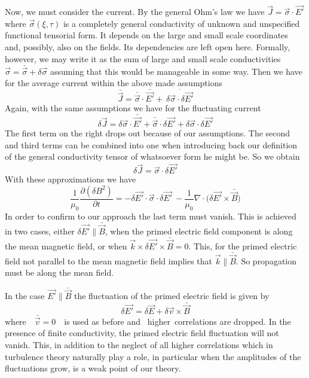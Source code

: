 \documentclass[ ]{copernicus2}
\begin{document}
{{{{Now, we must consider the current. By the general Ohm's law we have $\vec{J}=\vec{\sigma}\cdot\vec{E'}$ where $\vec{\sigma}(\xi,\tau)$ is a completely general conductivity of unknown and unspecified functional tensorial form. It depends on the large and small scale coordinates and, possibly, also on the fields. Its dependencies are left open here. Formally, however, we may write it as the sum of large and small scale conductivities $\vec{\sigma}=\bar{\vec{\sigma}}+\delta\vec{\sigma}$ assuming that this would be manageable in some way. Then we have for the average current within the above made assumptions 
\begin{displaymath}
\bar{\vec{J}}=\bar{\vec{\sigma}}\cdot\bar{\vec{E'}} +\ \overline{\delta\vec{\sigma}\cdot\delta\vec{E'}}
\end{displaymath}
Again, with the same assumptions we have for the fluctuating current
\begin{displaymath}
\delta\vec{J}=\delta\vec{\sigma}\cdot\bar{\vec{E'}}+ \bar{\vec{\sigma}}\cdot\delta\vec{E'} + \delta\vec{\sigma}\cdot\delta\vec{E'}
\end{displaymath}
The first term on the right drops out because of our assumptions. The second and third terms can be combined into one when introducing back our definition of the general conductivity tensor of whatsoever form he might be. So we obtain
\begin{displaymath}
\delta\vec{J}=\vec{\sigma}\cdot\delta\vec{E'} 
\end{displaymath}
With these approximations we have 
\begin{displaymath}
\frac{1}{\mu_0}\frac{\partial(\delta{B}^2)}{\partial t} =-\delta\vec{E'}\cdot\vec{\sigma}\cdot\delta\vec{E'}\ -\frac{1}{\mu_0}\nabla\cdot\Big(\delta\vec{E'}\times\bar{\vec{B}}
\Big)
\end{displaymath}
In order to confirm to our approach the last term must vanish. This is achieved in two cases, either $\delta\vec{E'}\|\bar{\vec{B}}$, when the primed electric field component is along the mean magnetic field, or when $\vec{k}\times\delta\vec{E'}\times\bar{\vec{B}}=0$. This, for the primed electric field not parallel to the mean magnetic field implies that $\vec{k}\|\bar{\vec{B}}$. So propagation must be along the mean field. }

{In the case $\vec{E'}\|\bar{\vec{B}}$ the fluctuation of the primed electric field is given by 
\begin{displaymath}
\delta\vec{E'}=\delta\vec{E}+\delta\vec{v}\times\bar{\vec{B}} 
\end{displaymath}
where\ \ $\bar{\vec{v}}=0$\ \ is used as before and \ higher\ correlations are dropped. In the presence of finite conductivity, the primed electric field fluctuation will not vanish. This, in addition to the neglect of all higher correlations which in turbulence theory naturally play a role, in particular when the amplitudes of the fluctuations grow, is a weak point of our theory.} 

}}}
\end{document}
